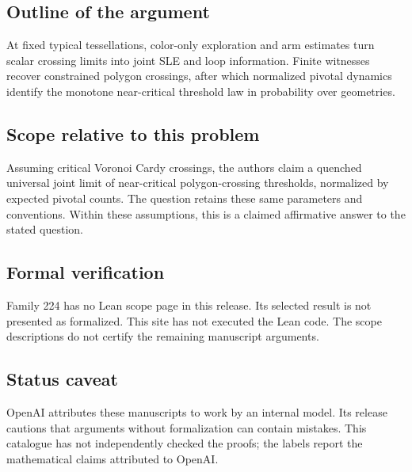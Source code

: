 \documentclass[11pt]{article}
\begin{document}
\subsection{Outline of the argument}
At fixed typical tessellations, color-only exploration and arm estimates turn scalar crossing limits into joint SLE and loop information. Finite witnesses recover constrained polygon crossings, after which normalized pivotal dynamics identify the monotone near-critical threshold law in probability over geometries.

\subsection{Scope relative to this problem}
Assuming critical Voronoi Cardy crossings, the authors claim a quenched universal joint limit of near-critical polygon-crossing thresholds, normalized by expected pivotal counts. The question retains these same parameters and conventions. Within these assumptions, this is a claimed affirmative answer to the stated question.

\subsection{Formal verification}
Family 224 has no Lean scope page in this release. Its selected result is not presented as formalized. This site has not executed the Lean code. The scope descriptions do not certify the remaining manuscript arguments.

\subsection{Status caveat}
OpenAI attributes these manuscripts to work by an internal model. Its release cautions that arguments without formalization can contain mistakes. This catalogue has not independently checked the proofs; the labels report the mathematical claims attributed to OpenAI.
\end{document}
